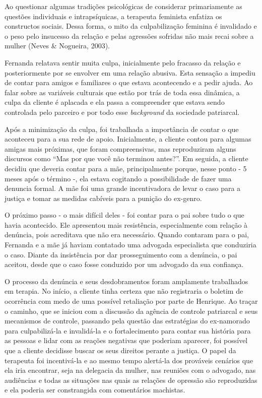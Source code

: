 Ao questionar algumas tradições psicológicas de considerar primariamente as questões individuais e intrapsíquicas, a terapeuta feminista enfatiza os constructos sociais. Dessa forma, o mito da culpabilização feminina é invalidado e o peso pelo insucesso da relação e pelas agressões sofridas não mais recai sobre a mulher (Neves \& Nogueira, 2003).

Fernanda relatava sentir muita culpa, inicialmente pelo fracasso da relação e posteriormente por se envolver em uma relação abusiva. Esta sensação a impediu de contar para amigos e familiares o que estava acontecendo e a pedir ajuda. Ao falar sobre as variáveis culturais que estão por trás de toda essa dinâmica, a culpa da cliente é aplacada e ela passa a compreender que estava sendo controlada pelo parceiro e por todo esse \textit{background} da sociedade patriarcal.

Após a minimização da culpa, foi trabalhada a importância de contar o que aconteceu para a sua rede de apoio. Inicialmente, a cliente contou para algumas amigas mais próximas, que foram compreensivas, mas reproduziram alguns discursos como “Mas por que você não terminou antes?”. Em seguida, a cliente decidiu que deveria contar para a mãe, principalmente porque, nesse ponto - 5 meses após o término -, ela estava cogitando a possibilidade de fazer uma denuncia formal. A mãe foi uma grande incentivadora de levar o caso para a justiça e tomar as medidas cabíveis para a punição do ex-genro.

O próximo passo - o mais difícil deles - foi contar para o pai sobre tudo o que havia acontecido. Ele apresentou mais resistência, especialmente com relação à denúncia, pois acreditava que não era necessário. Quando contaram para o pai, Fernanda e a mãe já haviam contatado uma advogada especialista que conduziria o caso. Diante da insistência por dar prosseguimento com a denúncia, o pai aceitou, desde que o caso fosse conduzido por um advogado da sua confiança. 

O processo da denúncia e seus desdobramentos foram amplamente trabalhados em terapia. No início, a cliente tinha certeza que não registraria o boletim de ocorrência com medo de uma possível retaliação por parte de Henrique. Ao traçar o caminho, que se iniciou com a discussão da agência de controle patriarcal e seus mecanismos de controle, passando pela questão das estratégias do ex-namorado para culpabilizá-la e invalidá-la e o fortalecimento para contar sua história para as pessoas e lidar com as reações negativas que poderiam aparecer, foi possível que a cliente decidisse buscar os seus direitos perante a justiça. O papel da terapeuta foi incentivá-la e ao mesmo tempo alertá-la dos prováveis cenários que ela iria encontrar, seja na delegacia da mulher, nas reuniões com o advogado, nas audiências e todas as situações nas quais as relações de opressão são reproduzidas e ela poderia ser constrangida com comentários machistas.

